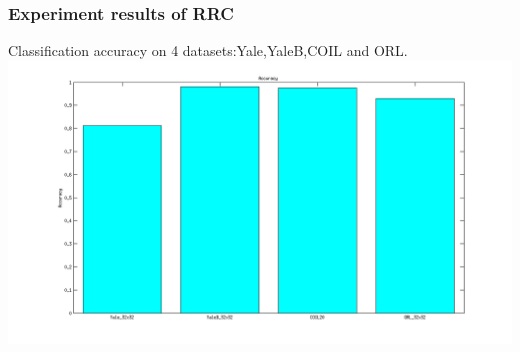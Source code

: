 \documentclass{beamer}
\begin{document}
\begin{frame}\frametitle{Experiment results of RRC}
Classification accuracy on 4 datasets:Yale,YaleB,COIL and ORL.
\includegraphics[scale=0.3]{images/accuracy}
\end{frame}
\end{document}
